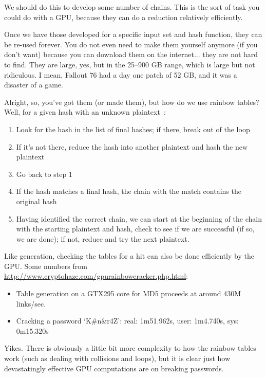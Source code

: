 We should do this to develop some number of chains. This is the sort of task you could do with a GPU, because they can do a reduction relatively efficiently. 

Once we have those developed for a specific input set and hash function, they can be re-used forever. You do not even need to make them yourself anymore (if you don't want) because you can download them on the internet... they are not hard to find. They are large, yes, but in the 25--900 GB range, which is large but not ridiculous. I mean, Fallout 76 had a day one patch of 52 GB, and it was a disaster of a game.

Alright, so, you've got them (or made them), but how do we use rainbow tables? Well, for a given hash with an unknown plaintext~\cite{rainbowtables}:
\begin{enumerate}
	\item Look for the hash in the list of final hashes; if there, break out of the loop
	\item If it's not there, reduce the hash into another plaintext and hash the new plaintext
	\item Go back to step 1
	\item If the hash matches a final hash, the chain with the match contains the original hash
	\item Having identified the correct chain, we can start at the beginning of the chain with the starting plaintext and hash, check to see if we are successful (if so, we are done); if not, reduce and try the next plaintext. 
\end{enumerate} 

Like generation, checking the tables for a hit can also be done efficiently by the GPU. Some numbers from \url{http://www.cryptohaze.com/gpurainbowcracker.php.html}: 
\begin{itemize}
	\item Table generation on a GTX295 core for MD5 proceeds at around 430M links/sec.
	\item Cracking a password `K\#n\&r4Z': real: 1m51.962s, user: 1m4.740s, sys: 0m15.320s
\end{itemize}

Yikes. There is obviously a little bit more complexity to how the rainbow tables work (such as dealing with collisions and loops), but it is clear just how devastatingly effective GPU computations are on breaking passwords.

